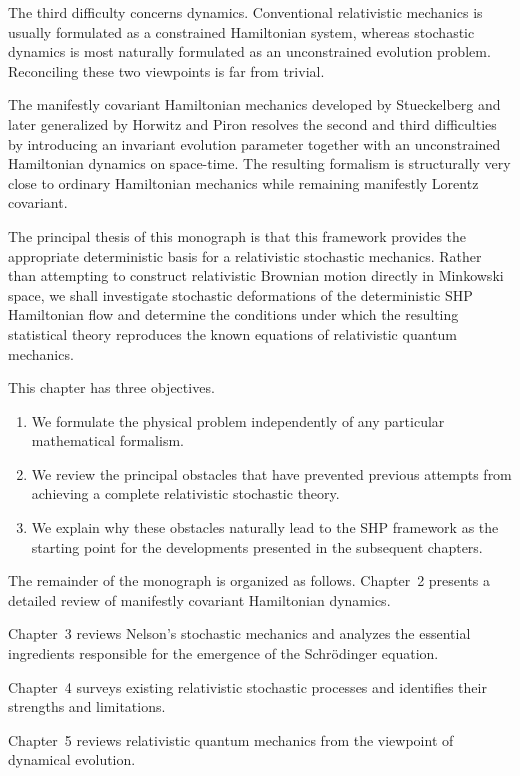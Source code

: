 The third difficulty concerns dynamics. Conventional relativistic
mechanics is usually formulated as a constrained Hamiltonian system,
whereas stochastic dynamics is most naturally formulated as an
unconstrained evolution problem. Reconciling these two viewpoints is far
from trivial.

The manifestly covariant Hamiltonian mechanics developed by
Stueckelberg and later generalized by Horwitz and Piron resolves the
second and third difficulties by introducing an invariant evolution
parameter together with an unconstrained Hamiltonian dynamics on
space-time. The resulting formalism is structurally very close to
ordinary Hamiltonian mechanics while remaining manifestly Lorentz
covariant.

The principal thesis of this monograph is that this framework provides
the appropriate deterministic basis for a relativistic stochastic
mechanics. Rather than attempting to construct relativistic Brownian
motion directly in Minkowski space, we shall investigate stochastic
deformations of the deterministic SHP Hamiltonian flow and determine the
conditions under which the resulting statistical theory reproduces the
known equations of relativistic quantum mechanics.

This chapter has three objectives.
\begin{enumerate}
   \item
    We formulate the physical problem independently of any
    particular mathematical formalism.
   \item
    We review the principal obstacles that have prevented previous
    attempts from achieving a complete relativistic stochastic theory.
   \item
    We explain why these obstacles naturally lead to the SHP
    framework as the starting point for the developments presented in the
    subsequent chapters.
\end{enumerate}

The remainder of the monograph is organized as follows.
Chapter~2 presents a detailed review of manifestly covariant
Hamiltonian dynamics.

Chapter~3 reviews Nelson's stochastic mechanics and analyzes the
essential ingredients responsible for the emergence of the Schrödinger
equation.

Chapter~4 surveys existing relativistic stochastic processes and
identifies their strengths and limitations.

Chapter~5 reviews relativistic quantum mechanics from the viewpoint of
dynamical evolution.

